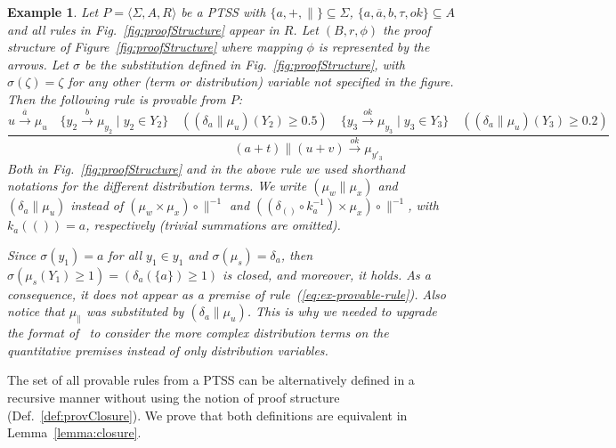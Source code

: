 \documentclass[submission,copyright,creativecommons]{eptcs}
\newtheorem{example}{Example}
\newcommand{\ddedrule}[2]{\frac{\displaystyle #1}{\displaystyle #2}}
\newcommand{\trans}[1][]{\xrightarrow{\, {#1} \, }}
\newcommand{\tuple}[1]{\langle{#1}\rangle}
\begin{document}
\begin{example} \label{ex:proofStructure}
 Let $P = \tuple{\Sigma, A, R}$ be a PTSS with
 $\{a,{+},{\parallel}\}\subseteq\Sigma$,
 $\{a,\overline{a},b,\tau,ok\}\subseteq A$ and all rules in
 Fig.~\ref{fig:proofStructure} appear in $R$.
Let $(B,r,\phi)$ the proof structure of
 Figure~\ref{fig:proofStructure} where mapping $\phi$ is represented
 by the arrows.
Let $\sigma$ be the substitution defined in
 Fig.~\ref{fig:proofStructure}, with $\sigma(\zeta)=\zeta$ for any
 other (term or distribution) variable not specified in the figure.
Then the following rule is provable from $P$:
\begin{equation}\label{eq:ex-provable-rule}
 \ddedrule{u \trans[\overline{a}] \mu_u \quad \{y_2 \trans[b] \mu_{y_2}\mid y_2 \in Y_2\} \quad ((\delta_a \parallel \mu_u) (Y_2) \geq 0.5) \quad \{y_3 \trans[\textit{ok}] \mu_{y_3} \mid y_3 \in Y_3\} \quad  ((\delta_a \parallel \mu_u)  (Y_3) \geq 0.2) }
{(a+t) \parallel (u + v) \trans[\textit{ok}] \mu_{y'_3} }
 \end{equation}
Both in Fig.~\ref{fig:proofStructure} and in the above rule we used
 shorthand notations for the different distribution terms.  We write
 $(\mu_w \parallel \mu_x)$ and $(\delta_a \parallel \mu_u)$ instead of
 $(\mu_w \times \mu_x)\circ{\parallel}^{-1}$ and $( (\delta_{()} \circ
 k_a^{-1}) \times \mu_x)\circ{\parallel}^{-1}$, with $k_a(())=a$,
 respectively (trivial summations are omitted).

 Since $\sigma(y_1) = a$ for all $y_1\in y_1$ and $\sigma(\mu_s) =
 \delta_a$, then $\sigma(\mu_s(Y_1) \geq 1) = (\delta_{a}(\{a\}) \geq
 1)$ is closed, and moreover, it holds.  As a consequence, it does not
 appear as a premise of rule~(\ref{eq:ex-provable-rule}).
Also notice that $\mu_{\parallel}$ was substituted by $(\delta_a
 \parallel \mu_u)$.  This is why we needed to upgrade the format
 of~\cite{DL-fossacs12} to consider the more complex distribution
 terms on the quantitative premises instead of only distribution
 variables.
\end{example}


The set of all provable rules from a PTSS can be alternatively defined
in a recursive manner without using the notion of proof structure
(Def.~\ref{def:provClosure}). We prove that both definitions are
equivalent in Lemma~\ref{lemma:closure}.
\end{document}
